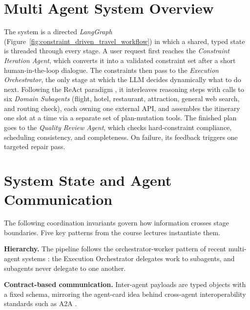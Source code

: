 \documentclass[a4paper,oneside,bibliography=totoc]{scrbook}
\begin{document}
\section{Multi Agent System Overview}
\label{sec:system:overview}


The system is a directed \textit{LangGraph}
(Figure~\ref{fig:constraint_driven_travel_workflow}) in which a shared,
typed state is threaded through every stage. A user request first
reaches the \emph{Constraint Iteration Agent}, which converts it into a
validated constraint set after a short human-in-the-loop dialogue. The
constraints then pass to the \emph{Execution Orchestrator}, the only
stage at which the LLM decides dynamically what to do next. Following
the ReAct paradigm \cite{yao2023react}, it interleaves reasoning steps
with calls to six \emph{Domain Subagents} (flight, hotel, restaurant,
attraction, general web search, and routing check), each owning one
external API, and assembles the 
itinerary  one slot at a time via a separate set of plan-mutation tools. The finished plan goes to the \emph{Quality Review Agent}, which checks hard-constraint compliance,
scheduling consistency, and completeness. On failure, its feedback
triggers one targeted repair pass.


\section{System State and Agent Communication}
\label{sec:system:state}
The following coordination invariants govern how information crosses stage
boundaries. Five key patterns from the course lectures instantiate them.

\vspace{0.25cm}
\textbf{Hierarchy.} The pipeline follows the orchestrator-worker
pattern of recent multi-agent systems
\cite{wu2023autogen,fourney2024magenticone}: the Execution Orchestrator
delegates work to subagents, and subagents never delegate to one
another.

\textbf{Contract-based communication.} Inter-agent payloads are
typed objects with a fixed schema, mirroring the agent-card idea behind
cross-agent interoperability standards such as A2A
\cite{surapaneni2025a2a}.
\end{document}
